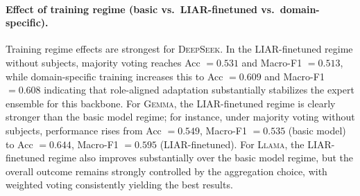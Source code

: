 \paragraph{Effect of training regime (basic vs.\ LIAR-finetuned vs.\ domain-specific).}
Training regime effects are strongest for \textsc{DeepSeek}.
In the LIAR-finetuned regime without subjects, majority voting reaches Acc $=0.531$ and Macro-F1 $=0.513$, while domain-specific training increases this to Acc $=0.609$ and Macro-F1 $=0.608$ indicating that role-aligned adaptation substantially stabilizes the expert ensemble for this backbone.
For \textsc{Gemma}, the LIAR-finetuned regime is clearly stronger than the basic model regime; for instance, under majority voting without subjects, performance rises from Acc $=0.549$, Macro-F1 $=0.535$ (basic model) to Acc $=0.644$, Macro-F1 $=0.595$ (LIAR-finetuned).
For \textsc{Llama}, the LIAR-finetuned regime also improves substantially over the basic model regime, but the overall outcome remains strongly controlled by the aggregation choice, with weighted voting consistently yielding the best results.

